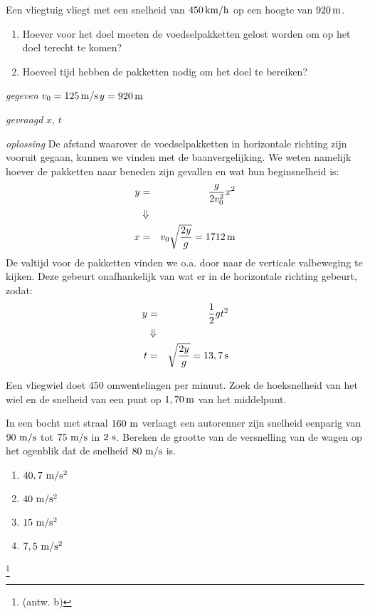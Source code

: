 \documentclass{ximera}
\begin{document}
\begin{exercise}[Opgave] Een vliegtuig vliegt met een snelheid van $450\rm\,km/h$ op een hoogte van $920\rm\,m$.
\begin{enumerate}
\item Hoever voor het doel moeten de voedselpakketten gelost worden om op het doel terecht te komen?
\item Hoeveel tijd hebben de pakketten nodig om het doel te bereiken?
\end{enumerate}
\begin{oplossing}
\textit{gegeven}  $v_0=125\rm\,m/s$\newline$y=920\rm\,m$

\textit{gevraagd} $x$, $t$

\textit{oplossing} De afstand waarover de voedselpakketten in
horizontale richting zijn vooruit gegaan, kunnen we vinden met de
baanvergelijking. We weten namelijk hoever de pakketten naar beneden
zijn gevallen en wat hun beginsnelheid is:
\begin{eqnarray*}
y&=&\frac{g}{2v_0^2}x^2\\
&\Downarrow&\\
x&=&v_0\sqrt{\frac{2y}{g}}=1712\rm\,m
\end{eqnarray*}
De valtijd voor de pakketten vinden we o.a. door naar de verticale
valbeweging te kijken. Deze gebeurt onafhankelijk van wat er in de
horizontale richting gebeurt, zodat:
\begin{eqnarray*}
y&=&\frac{1}{2}gt^2\\
&\Downarrow&\\
t&=&\sqrt{\frac{2y}{g}}=13,7\rm\,s
\end{eqnarray*}
\end{oplossing}









\end{exercise}

\begin{exercise} Een vliegwiel doet 450 omwentelingen per minuut. Zoek de hoeksnelheid van het wiel en de snelheid van een punt op $1,70\rm\,m$ van het middelpunt.

\end{exercise}

\begin{exercise} In een bocht met straal $160~\rm m$ verlaagt een autorenner
zijn snelheid eenparig van $90~\rm m/s$ tot $75~\rm m/s$ in $2~\rm
s$. Bereken de grootte van de versnelling van de wagen op het
ogenblik dat de snelheid $80~\rm m/s$ is.
\begin{enumerate}
\item $40,7~\rm m/s^2$
\item $40~\rm m/s^2$
\item $15~\rm m/s^2$
\item $7,5~\rm m/s^2$
\end{enumerate}
\footnote{(antw. b)}

\end{exercise}
\end{document}
